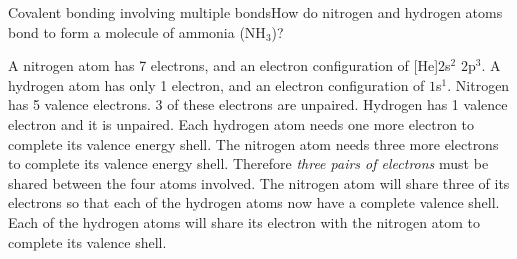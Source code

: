 \begin{wex}{Covalent bonding involving multiple bonds}{How do nitrogen and hydrogen atoms bond to form a molecule of ammonia (NH$_{3}$)?\\}
{
A nitrogen atom has 7 electrons, and an electron configuration of [He]$2$s$^{2}$ $2$p$^{3}$. A hydrogen atom has only 1 electron, and an electron configuration of $1$s$^{1}$.
Nitrogen has 5 valence electrons. 3 of these electrons are unpaired. Hydrogen has 1 valence electron and it is unpaired.
Each hydrogen atom needs one more electron to complete its valence energy shell. The nitrogen atom needs three more electrons to complete its valence energy shell. Therefore \textit{three pairs of electrons} must be shared between the four atoms involved. The nitrogen atom will share three of its electrons so that each of the hydrogen atoms now have a complete valence shell. Each of the hydrogen atoms will share its electron with the nitrogen atom to complete its valence shell.
\begin{figure}[H]
\label{fig:bonding:ammonia}
\end{figure}
}
\end{wex}


